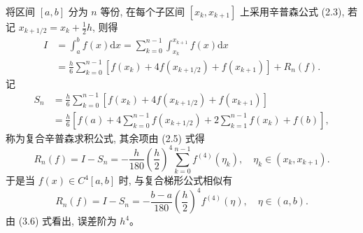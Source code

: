 \documentclass{ctexart}%
\begin{document}
将区间 $[a, b]$ 分为 $n$ 等份, 在每个子区间 $\left[x_{k}, x_{k+1}\right]$ 上采用辛普森公式 (2.3), 若记 $x_{k+1 / 2}=x_{k}+\frac{1}{2} h$, 则得
$$
\begin{aligned}
I &=\int_{a}^{b} f(x) \mathrm{d} x=\sum_{k=0}^{n-1} \int_{x_{k}}^{x_{k+1}} f(x) \mathrm{d} x \\
&=\frac{h}{6} \sum_{k=0}^{n-1}\left[f\left(x_{k}\right)+4 f\left(x_{k+1 / 2}\right)+f\left(x_{k+1}\right)\right]+R_{n}(f) .
\end{aligned}
$$
记
$$
\begin{aligned}
S_{n} &=\frac{h}{6} \sum_{k=0}^{n-1}\left[f\left(x_{k}\right)+4 f\left(x_{k+1 / 2}\right)+f\left(x_{k+1}\right)\right] \\
&=\frac{h}{6}\left[f(a)+4 \sum_{k=0}^{n-1} f\left(x_{k+1 / 2}\right)+2 \sum_{k=1}^{n-1} f\left(x_{k}\right)+f(b)\right],
\end{aligned}
$$
称为复合辛普森求积公式, 其余项由 (2.5) 式得
$$
R_{n}(f)=I-S_{n}=-\frac{h}{180}\left(\frac{h}{2}\right)^{4} \sum_{k=0}^{n-1} f^{(4)}\left(\eta_{k}\right), \quad \eta_{k} \in\left(x_{k}, x_{k+1}\right) .
$$
于是当 $f(x) \in C^{4}[a, b]$ 时, 与复合梯形公式相似有$$
R_{n}(f)=I-S_{n}=-\frac{b-a}{180}\left(\frac{h}{2}\right)^{4} f^{(4)}(\eta), \quad \eta \in(a, b) .
$$
由 (3.6) 式看出, 误差阶为 $h^{4}$。
\end{document}
